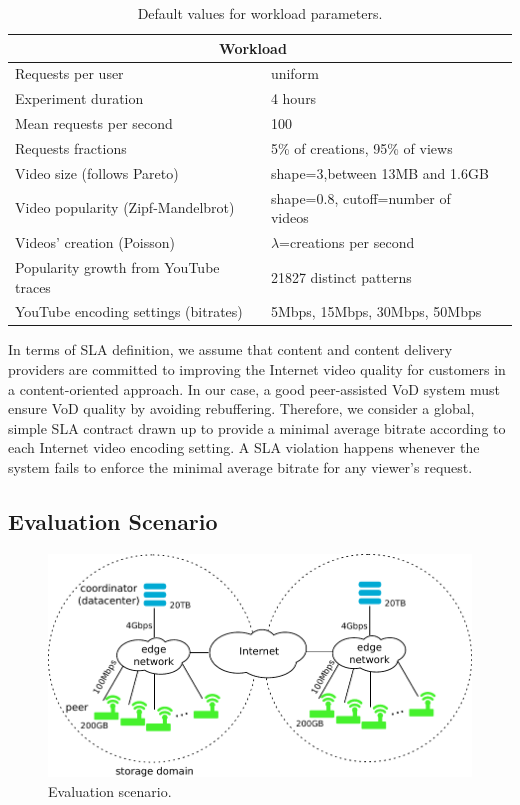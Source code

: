 \begin{table}
  \label{tab:workload_default_parameters}
	\begin{center}
		\caption{Default values for workload parameters.}
  		\label{tab:workload_parameters}
		\begin{tabular}{|p{6cm}|p{6cm}|l|}
			\hline
			\multicolumn{2}{|c|}{Workload} \\
			\hline
			\hline
			Requests per user&uniform\\
			\hline
			Experiment duration&4 hours\\
			\hline
			Mean requests per second&100\\
			\hline
			Requests fractions&5\% of creations, 95\% of views\\
			\hline
			Video size (follows Pareto)&shape=3,between 13MB and 1.6GB\\%
			\hline
			Video popularity (Zipf-Mandelbrot)&shape=0.8, cutoff=number of videos\\
			\hline
			Videos{'} creation (Poisson)&$\lambda$=creations per second\\
			\hline
			Popularity growth from YouTube traces&21827 distinct patterns\\
			\hline
			YouTube encoding settings (bitrates)&5Mbps, 15Mbps, 30Mbps, 50Mbps\\
			\hline
		\end{tabular}
	\end{center}
\end{table}

In terms of SLA definition, we assume that content and content delivery providers are committed to improving the Internet video quality for customers in a content-oriented approach. In our case, a good peer-assisted VoD system must ensure VoD quality by avoiding rebuffering. Therefore, we consider a global, simple SLA contract drawn up to provide a minimal average bitrate according to each Internet video encoding setting. A SLA violation happens whenever the system fails to enforce the minimal average bitrate for any viewer's request. 


\subsection{Evaluation Scenario}
\label{subsec:methodology_evaluation_scenario}

\begin{figure}
  \centering
     \includegraphics[width=.7\textwidth]{inputs/img/evaluation_scheme}
  \caption{Evaluation scenario.}
  \label{fig:evaluation_scenario}
\end{figure}

